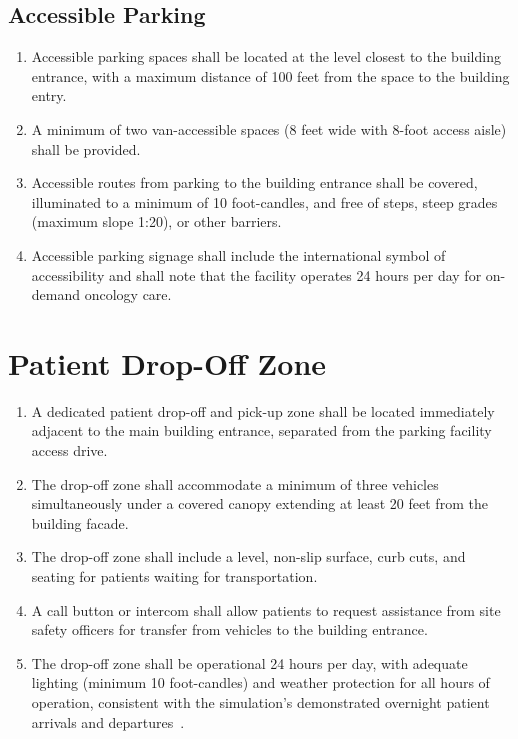 \subsection{Accessible Parking}

\begin{enumerate}[label=(\alph*)]
\item Accessible parking spaces shall be located at the level closest to the
  building entrance, with a maximum distance of 100 feet from the space to
  the building entry.

\item A minimum of two van-accessible spaces (8 feet wide with 8-foot access
  aisle) shall be provided.

\item Accessible routes from parking to the building entrance shall be covered,
  illuminated to a minimum of 10 foot-candles, and free of steps, steep grades
  (maximum slope 1:20), or other barriers.

\item Accessible parking signage shall include the international symbol of
  accessibility and shall note that the facility operates 24 hours per day
  for on-demand oncology care.
\end{enumerate}

\section{Patient Drop-Off Zone}

\begin{enumerate}[label=(\alph*)]
\item A dedicated patient drop-off and pick-up zone shall be located immediately
  adjacent to the main building entrance, separated from the parking facility
  access drive.

\item The drop-off zone shall accommodate a minimum of three vehicles
  simultaneously under a covered canopy extending at least 20 feet from the
  building facade.

\item The drop-off zone shall include a level, non-slip surface, curb cuts,
  and seating for patients waiting for transportation.

\item A call button or intercom shall allow patients to request assistance
  from site safety officers for transfer from vehicles to the building
  entrance.

\item The drop-off zone shall be operational 24 hours per day, with adequate
  lighting (minimum 10 foot-candles) and weather protection for all hours of
  operation, consistent with the simulation's demonstrated overnight patient
  arrivals and departures~\cite{newtrial2026}.
\end{enumerate}

